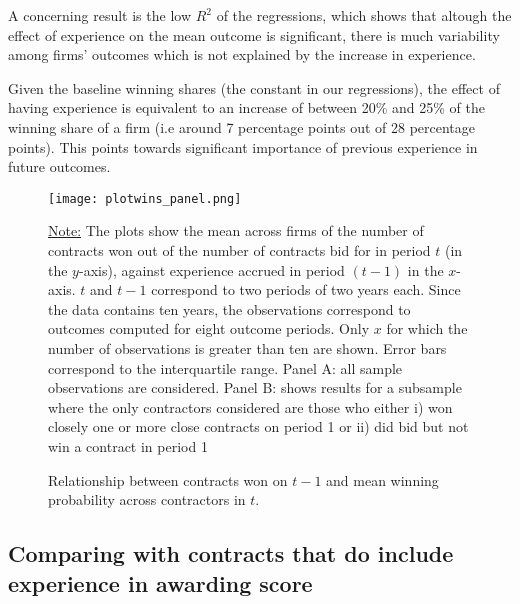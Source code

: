 A concerning result is the low $R^2$ of the regressions, which shows that altough the effect of experience on the mean outcome is significant, there is much variability among firms' outcomes which is not explained by the increase in experience.

Given the baseline winning shares (the constant in our regressions), the effect of having experience is equivalent to an increase of between 20\% and 25\% of the winning share of a firm (i.e around 7 percentage points out of 28 percentage points). This points towards significant importance of previous experience in future outcomes.


\begin{figure}
  \texttt{[image: plotwins\_panel.png]}
  \caption{Relationship between contracts won on $t-1$ and mean winning probability across contractors in $t$.}
  \label{fig:plotresults_both}
  \vskip 0.5mm
  { \footnotesize \underline{Note:} The plots show the mean across firms of the number of contracts won out of the number of contracts bid for in period $t$ (in the $y$-axis), against experience accrued in period $(t-1)$ in the $x$-axis. $t$ and $t-1$ correspond to two periods of two years each. Since the data contains ten years, the observations correspond to outcomes computed for eight outcome periods.  Only $x$ for which the number of observations is greater than ten are shown. Error bars correspond to the interquartile range. Panel A: all sample observations are considered. Panel B:  shows results for a subsample where the only contractors considered are those who either i) won closely one or more close contracts  on period 1 or ii) did bid but not win a contract in period 1\par}
\end{figure}
\clearpage





\clearpage

\subsection{Comparing with contracts that do include experience in awarding score}

